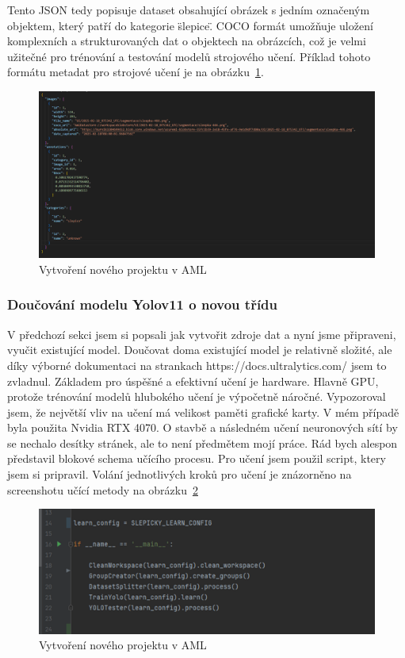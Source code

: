 Tento JSON tedy popisuje dataset obsahující obrázek s jedním označeným objektem, který patří do kategorie \"slepice\".
COCO formát umožňuje uložení komplexních a strukturovaných dat o objektech na obrázcích, což je velmi užitečné pro trénování a testování modelů strojového učení.
Příklad tohoto formátu metadat pro strojové učení je na obrázku~\ref{fig:coco_format}.

\begin{figure}[h]
    \centering
    \includegraphics[width=\textwidth]{img/coco_format}
    \caption{Vytvoření nového projektu v AML}
    \label{fig:coco_format}
\end{figure}

\subsubsection{Doučování modelu Yolov11 o novou třídu}
V předchozí sekci jsem si popsali jak vytvořit zdroje dat a nyní jsme připraveni, vyučit existující model.
Doučovat doma existující model je relativně složité, ale díky výborné dokumentaci na strankach https://docs.ultralytics.com/ jsem to zvladnul.
Základem pro úspěšné a efektivní učení je hardware.
Hlavně GPU, protože trénování modelů hlubokého učení je výpočetně náročné.
Vypozoroval jsem, že největší vliv na učení má velikost paměti grafické karty.
V mém případě byla použita Nvidia RTX 4070.
O stavbě a následném učení neuronových sítí by se nechalo desítky stránek, ale to není předmětem mojí práce.
Rád bych alespon představil blokové schema učícího procesu.\newline
\newline
Pro učení jsem použil script, ktery jsem si pripravil.
Volání jednotlivých kroků pro učení je znázorněno na screenshotu učící metody na obrázku~\ref{fig:learn_script}

\begin{figure}[h]
    \centering
    \includegraphics[width=\textwidth]{img/learn_script}
    \caption{Vytvoření nového projektu v AML}
    \label{fig:learn_script}
\end{figure}

